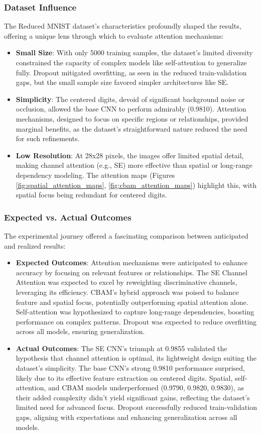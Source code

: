 \documentclass[12pt]{article}
\begin{document}
\subsubsection{Dataset Influence}
The Reduced MNIST dataset's characteristics profoundly shaped the results, offering a unique lens through which to evaluate attention mechanisms:
\begin{itemize}
    \item \textbf{Small Size}: With only 5000 training samples, the dataset's limited diversity constrained the capacity of complex models like self-attention to generalize fully. Dropout mitigated overfitting, as seen in the reduced train-validation gaps, but the small sample size favored simpler architectures like SE.
    \item \textbf{Simplicity}: The centered digits, devoid of significant background noise or occlusion, allowed the base CNN to perform admirably (0.9810). Attention mechanisms, designed to focus on specific regions or relationships, provided marginal benefits, as the dataset's straightforward nature reduced the need for such refinements.
    \item \textbf{Low Resolution}: At 28x28 pixels, the images offer limited spatial detail, making channel attention (e.g., SE) more effective than spatial or long-range dependency modeling. The attention maps (Figures \ref{fig:spatial_attention_maps}, \ref{fig:cbam_attention_maps}) highlight this, with spatial focus being redundant for centered digits.
\end{itemize}

\subsubsection{Expected vs. Actual Outcomes}
The experimental journey offered a fascinating comparison between anticipated and realized results:
\begin{itemize}
    \item \textbf{Expected Outcomes}: Attention mechanisms were anticipated to enhance accuracy by focusing on relevant features or relationships. The SE Channel Attention was expected to excel by reweighting discriminative channels, leveraging its efficiency. CBAM's hybrid approach was poised to balance feature and spatial focus, potentially outperforming spatial attention alone. Self-attention was hypothesized to capture long-range dependencies, boosting performance on complex patterns. Dropout was expected to reduce overfitting across all models, ensuring generalization.
    \item \textbf{Actual Outcomes}: The SE CNN's triumph at 0.9855 validated the hypothesis that channel attention is optimal, its lightweight design suiting the dataset's simplicity. The base CNN's strong 0.9810 performance surprised, likely due to its effective feature extraction on centered digits. Spatial, self-attention, and CBAM models underperformed (0.9790, 0.9820, 0.9830), as their added complexity didn't yield significant gains, reflecting the dataset's limited need for advanced focus. Dropout successfully reduced train-validation gaps, aligning with expectations and enhancing generalization across all models.
\end{itemize}
\end{document}
